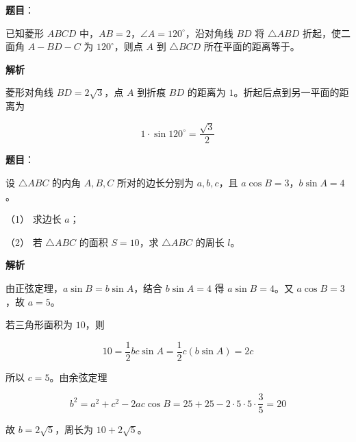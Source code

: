 \begin{answer}

\textbf{题目}：

已知菱形 $ABCD$ 中，$AB=2$，$\angle A=120^\circ$，沿对角线 $BD$ 将 $\triangle ABD$ 折起，使二面角 $A-BD-C$ 为 $120^\circ$，则点 $A$ 到 $\triangle BCD$ 所在平面的距离等于\gkblank{}。

\textbf{解析}

菱形对角线 $BD=2\sqrt3$，点 $A$ 到折痕 $BD$ 的距离为 $1$。折起后点到另一平面的距离为

\nopagebreak[4]
\[
1\cdot\sin120^\circ=\frac{\sqrt3}{2}
\]


\end{answer}
\begin{answer}

\textbf{题目}：

设 $\triangle ABC$ 的内角 $A,B,C$ 所对的边长分别为 $a,b,c$，且 $a\cos B=3$，$b\sin A=4$。

（1） 求边长 $a$；

（2） 若 $\triangle ABC$ 的面积 $S=10$，求 $\triangle ABC$ 的周长 $l$。

\textbf{解析}


由正弦定理，$a\sin B=b\sin A$，结合 $b\sin A=4$ 得 $a\sin B=4$。又 $a\cos B=3$，故 $a=5$。


若三角形面积为 $10$，则

\nopagebreak[4]
\[
10=\frac12bc\sin A=\frac12c(b\sin A)=2c
\]

所以 $c=5$。由余弦定理

\nopagebreak[4]
\[
b^2=a^2+c^2-2ac\cos B=25+25-2\cdot5\cdot5\cdot\frac35=20
\]

故 $b=2\sqrt5$，周长为 $10+2\sqrt5$。



\end{answer}

